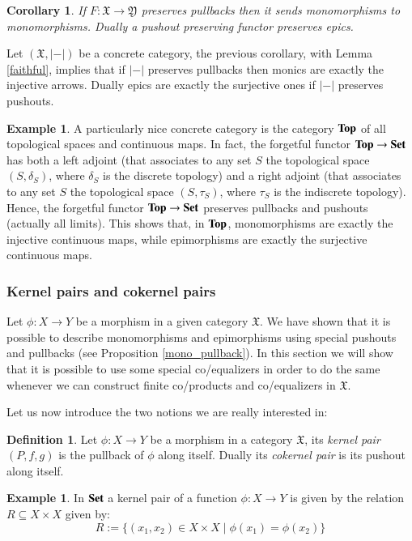 \documentclass[12pt]{article}
\newtheorem{corollary}[lemma]{Corollary}
\theoremstyle{definition}
\newtheorem{definition}[lemma]{Definition}
\newtheorem{example}[lemma]{Example}
\def\X{\mathfrak X}
\def\Y{\mathfrak Y}
\newcommand{\Set}{\textbf{\textup{Set}}}
\renewcommand{\Top}{\textbf{\textup{Top}}}
\numberwithin{equation}{section}
\begin{document}
\begin{corollary}\label{pb_mono}If $F:\X\rightarrow \Y$ preserves pullbacks then it sends monomorphisms to monomorphisms. Dually a pushout preserving functor preserves epics.
\end{corollary}

Let $(\X, |-|)$ be a concrete category, the previous corollary, with Lemma \ref{faithful}, implies that if $|-|$ preserves pullbacks then monics are exactly the injective arrows. Dually epics are exactly the surjective ones if $|-|$ preserves pushouts.

\begin{example}
 A particularly nice concrete category is the category $\Top$ of all topological spaces and continuous maps. In fact, the forgetful functor $\Top\to \Set$ has both a left adjoint (that associates to any set $S$ the topological space $(S,\delta_S)$, where $\delta_S$ is the discrete topology) and a right adjoint (that associates to any set $S$ the topological space $(S,\tau_S)$, where $\tau_S$ is the indiscrete topology). Hence, the forgetful functor $\Top\to \Set$ preserves pullbacks and pushouts (actually all limits). This shows that, in $\Top$, monomorphisms are exactly the injective continuous maps, while epimorphisms are exactly the surjective continuous maps.
\end{example}


\subsubsection{Kernel pairs and cokernel pairs}

Let $\phi\colon X\to Y$ be a morphism in a given category $\X$. We have shown that it  is possible to describe monomorphisms and epimorphisms using special pushouts and pullbacks (see Proposition \ref{mono_pullback}). In this section we will show that it is possible to use some special co/equalizers in order to do the same  whenever we can construct finite co/products and co/equalizers in  $\X$.


Let us now introduce the two notions we are really interested in:

\begin{definition}
	Let $\phi:X\rightarrow Y$ be a morphism in a category $\X$, its \emph{kernel pair} $(P, f, g)$ is the pullback of $\phi$ along itself. Dually its \emph{cokernel pair} is its pushout along itself.
\end{definition}
\begin{example}In $\Set$ a kernel pair of a function $\phi:X\rightarrow Y$ is given by the relation $R\subseteq X\times X$ given by:
	\[
	R:=\{(x_1,x_2)\in X\times X \mid \phi(x_1)=\phi(x_2)\}
	\]
\end{example}
\end{document}
